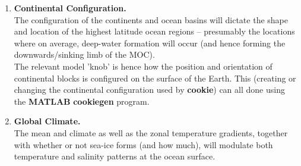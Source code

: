 \vspace{1mm}
\begin{enumerate}
\vspace{1mm}
\item \textbf{Continental Configuration.}
\vspace{1mm}
\\The configuration of the continents and ocean basins will dictate the shape and location of the highest latitude ocean regions -- presumably the locations where on average, deep-water formation will occur (and hence forming the downwards/sinking limb of the MOC).
\\The relevant model 'knob' is hence how the position and orientation of continental blocks is configured on the surface of the Earth. This (creating or changing the continental configuration used by \textbf{cookie}) can all done using the \textbf{MATLAB} \textbf{cookiegen} program.
\vspace{1mm}
\item \textbf{Global Climate.}
\vspace{1mm}
\\The mean and climate as well as the zonal temperature gradients, together with whether or not sea-ice forms (and how much), will modulate both temperature and salinity patterns at the ocean surface.

\newpage


\end{enumerate}
